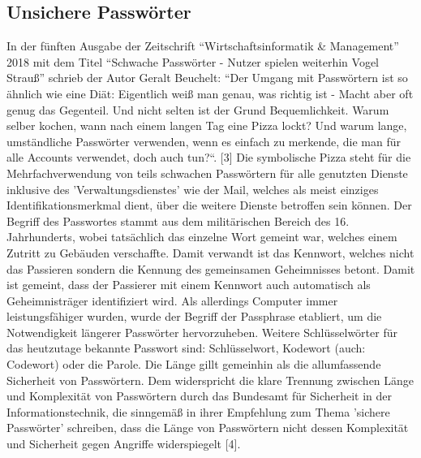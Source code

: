 \subsection{Unsichere Passwörter}
In der fünften Ausgabe der Zeitschrift ``Wirtschaftsinformatik \& Management''  2018 mit dem Titel ``Schwache Passwörter - Nutzer spielen weiterhin Vogel Strauß'' schrieb der Autor Geralt Beuchelt: ``Der Umgang mit Passwörtern ist so ähnlich wie eine Diät: Eigentlich weiß man genau, was richtig ist - Macht aber oft genug das Gegenteil. Und nicht selten ist der Grund Bequemlichkeit. Warum selber kochen, wann nach einem langen Tag eine Pizza lockt? Und warum lange, umständliche Passwörter verwenden, wenn es einfach zu merkende, die man für alle Accounts verwendet, doch auch tun?``. [3]
Die symbolische Pizza steht für die Mehrfachverwendung von teils schwachen Passwörtern für alle genutzten Dienste inklusive des 'Verwaltungsdienstes' wie der Mail, welches als meist einziges Identifikationsmerkmal dient, über die weitere Dienste betroffen sein können. Der Begriff des Passwortes stammt aus dem militärischen Bereich des 16. Jahrhunderts, wobei tatsächlich das einzelne Wort gemeint war, welches einem Zutritt zu Gebäuden verschaffte. Damit verwandt ist das Kennwort, welches nicht das Passieren sondern die Kennung des gemeinsamen Geheimnisses betont. Damit ist gemeint, dass der Passierer mit einem Kennwort auch automatisch als Geheimnisträger identifiziert wird. Als allerdings Computer immer leistungsfähiger wurden, wurde der Begriff der Passphrase etabliert, um die Notwendigkeit längerer Passwörter hervorzuheben. Weitere Schlüsselwörter für das heutzutage bekannte Passwort sind: Schlüsselwort, Kodewort (auch: Codewort) oder die Parole. Die Länge gillt gemeinhin als die allumfassende Sicherheit von Passwörtern. Dem widerspricht die klare Trennung zwischen Länge und Komplexität von Passwörtern durch das Bundesamt für Sicherheit in der Informationstechnik, die sinngemäß in ihrer Empfehlung zum Thema 'sichere Passwörter' schreiben, dass die Länge von Passwörtern nicht dessen Komplexität und Sicherheit gegen Angriffe widerspiegelt [4].

